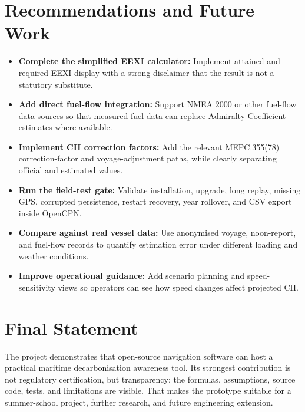 \section{Recommendations and Future Work}
\begin{itemize}
    \item \textbf{Complete the simplified EEXI calculator:} Implement attained and required EEXI display with a strong disclaimer that the result is not a statutory substitute.
    \item \textbf{Add direct fuel-flow integration:} Support NMEA 2000 or other fuel-flow data sources so that measured fuel data can replace Admiralty Coefficient estimates where available.
    \item \textbf{Implement CII correction factors:} Add the relevant MEPC.355(78) correction-factor and voyage-adjustment paths, while clearly separating official and estimated values.
    \item \textbf{Run the field-test gate:} Validate installation, upgrade, long replay, missing GPS, corrupted persistence, restart recovery, year rollover, and CSV export inside OpenCPN.
    \item \textbf{Compare against real vessel data:} Use anonymised voyage, noon-report, and fuel-flow records to quantify estimation error under different loading and weather conditions.
    \item \textbf{Improve operational guidance:} Add scenario planning and speed-sensitivity views so operators can see how speed changes affect projected CII.
\end{itemize}

\section{Final Statement}
The project demonstrates that open-source navigation software can host a practical maritime decarbonisation awareness tool. Its strongest contribution is not regulatory certification, but transparency: the formulas, assumptions, source code, tests, and limitations are visible. That makes the prototype suitable for a summer-school project, further research, and future engineering extension.
